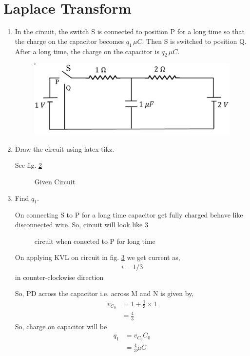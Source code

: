 \documentclass[journal,12pt,twocolumn]{IEEEtran}
\renewcommand\thesection{\arabic{section}}
\begin{document}
 \section{Laplace Transform}
\begin{enumerate}[label=\arabic*.,ref=\thesection.\theenumi]
\item In the circuit, the switch S is connected to position P for a long time so that the charge on the capacitor
	becomes $q_1 \, \mu C$. Then S is switched to position Q.  After a long time, the charge on the capacitor is
		$q_2 \, \mu C$.
		\begin{figure}[!ht]
			\centering
			\includegraphics[width=\columnwidth]{figs/ckt.jpg}
			\caption{}
			\label{fig:ckt}
\end{figure}
\item Draw the circuit using latex-tikz.

	\solution See fig. \ref{crct:2.2}
\begin{figure}[!ht]
	
	\centering
	\caption{Given Circuit}
	\label{crct:2.2}
\end{figure}

\item Find $q_1$.

	\solution
		On connecting S to P for a long time capacitor get fully charged behave like disconnected wire. So, circuit will look like \ref{crct:2.3}
\begin{figure}[!ht]
	
	\centering
	\caption{circuit when conected to P for long time}
	\label{crct:2.3}
\end{figure}


		On applying KVL on circuit in fig. \ref{crct:2.3} we get current as,
		\begin{align}
			i=1/3	
		\end{align}
in counter-clockwise direction

So, PD across the capacitor i.e. across M and N is given by,
		\begin{align}
			v_{C_0}&=1+\frac{1}{3}\times 1\\
			&=\frac{4}{3}
		\end{align}
		So, charge on capacitor will be
		\begin{align}
			q_1&=v_{C_0}C_0\\
			&=\frac{4}{3}\mu C
		\end{align}
			

\end{enumerate}
\end{document}
